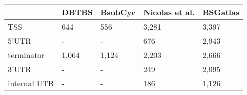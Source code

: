 
\begin{tabular}{lllll}
\toprule
  & DBTBS & BsubCyc & Nicolas et al. & BSGatlas\\
\midrule
TSS & 644 & 556 & 3,281 & 3,397\\
5'UTR & - & - & 676 & 2,943\\
terminator & 1,064 & 1,124 & 2,203 & 2,666\\
3'UTR & - & - & 249 & 2,095\\
internal UTR & - & - & 186 & 1,126\\
\bottomrule
\end{tabular}
